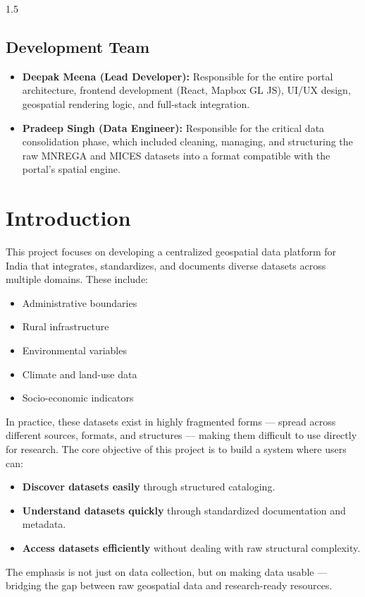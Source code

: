 \documentclass[12pt,a4paper]{report}
\begin{document}
\begin{spacing}{1.5}
\section*{Development Team}
\begin{itemize}
    \item \textbf{Deepak Meena (Lead Developer):} Responsible for the entire portal architecture, frontend development (React, Mapbox GL JS), UI/UX design, geospatial rendering logic, and full-stack integration.
    \item \textbf{Pradeep Singh (Data Engineer):} Responsible for the critical data consolidation phase, which included cleaning, managing, and structuring the raw MNREGA and MICES datasets into a format compatible with the portal's spatial engine.
\end{itemize}

\newpage

\tableofcontents
\newpage

\listoffigures
\listoftables
\newpage

\chapter{Introduction}

This project focuses on developing a centralized geospatial data platform for India that integrates, standardizes, and documents diverse datasets across multiple domains. These include:
\begin{itemize}
    \item Administrative boundaries
    \item Rural infrastructure
    \item Environmental variables
    \item Climate and land-use data
    \item Socio-economic indicators
\end{itemize}

In practice, these datasets exist in highly fragmented forms — spread across different sources, formats, and structures — making them difficult to use directly for research. The core objective of this project is to build a system where users can:
\begin{itemize}
    \item \textbf{Discover datasets easily} through structured cataloging.
    \item \textbf{Understand datasets quickly} through standardized documentation and metadata.
    \item \textbf{Access datasets efficiently} without dealing with raw structural complexity.
\end{itemize}
The emphasis is not just on data collection, but on making data usable — bridging the gap between raw geospatial data and research-ready resources.


\end{spacing}
\end{document}
